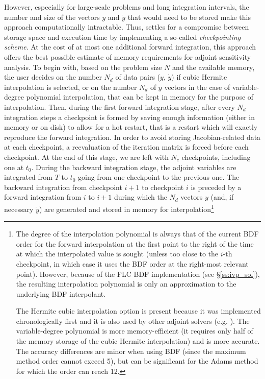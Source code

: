 However, especially for large-scale problems and long integration
intervals, the number and size of the vectors $y$ and ${\dot y}$ that would 
need to be stored make this approach computationally intractable. 
Thus, {\cvodes} settles for a compromise between storage space and execution time by
implementing a so-called {\em checkpointing scheme}. At the cost of at most one
additional forward integration, this approach offers the best possible estimate
of memory requirements for adjoint sensitivity analysis. To begin with, based on
the problem size $N$ and the available memory, the user decides on the number
$N_d$ of data pairs ($y$, ${\dot y}$) if cubic Hermite interpolation is selected, 
or on the number $N_d$ of $y$ vectors in the case of variable-degree polynomial
interpolation, that can be kept in memory for the purpose of interpolation. 
Then, during the first forward integration stage, after
every $N_d$ integration steps a checkpoint is formed by saving enough information
(either in memory or on disk) to allow for a hot restart, that is a restart
which will exactly reproduce the forward integration. In order to avoid storing
Jacobian-related data at each checkpoint, a reevaluation of the iteration matrix
is forced before each checkpoint. At the end of this stage, we are left with $N_c$ 
checkpoints, including one at $t_0$.
During the backward integration stage, the adjoint variables are integrated
from $T$ to $t_0$ going from one checkpoint to the previous one.
The backward integration from checkpoint $i+1$ to checkpoint $i$ is preceded
by a forward integration from $i$ to $i+1$ during which the $N_d$ vectors 
$y$ (and, if necessary ${\dot y}$) are generated and stored in memory for 
interpolation\footnote{The degree of the 
interpolation polynomial is always that of the current BDF order for the forward
interpolation at the first point to the right of the time at which the interpolated
value is sought (unless too close to the $i$-th checkpoint, in which case it uses
the BDF order at the right-most relevant point). However, because of the FLC BDF
implementation (see \S\ref{ss:ivp_sol}), the resulting interpolation polynomial
is only an approximation to the underlying BDF interpolant.

The Hermite cubic interpolation option is present because it was implemented
chronologically first and it is also used by other adjoint solvers (e.g. {\daspkadjoint}).
The variable-degree polynomial is more memory-efficient (it requires only half of the
memory storage of the cubic Hermite interpolation) and is more accurate. 
The accuracy differences are minor when using BDF (since the maximum method order cannot 
exceed 5), but can be significant for the Adams method for which the order can reach
12.}
